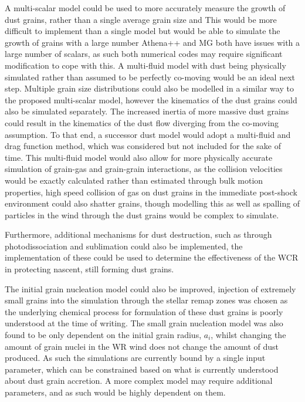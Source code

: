 A multi-scalar model could be used to more accurately measure the growth of dust grains, rather than a single average grain size and 
This would be more difficult to implement than a single model but would be able to simulate the growth of grains with a large number 
Athena++ and MG both have issues with a large number of scalars, as such both numerical codes may require significant modification to cope with this.
A multi-fluid model with dust being physically simulated rather than assumed to be perfectly co-moving would be an ideal next step.
Multiple grain size distributions could also be modelled in a similar way to the proposed multi-scalar model, however the kinematics of the dust grains could also be simulated separately.
The increased inertia of more massive dust grains could result in the kinematics of the dust flow diverging from the co-moving assumption.
To that end, a successor dust model would adopt a multi-fluid and drag function method, which was considered but not included for the sake of time.
This multi-fluid model would also allow for more physically accurate simulation of grain-gas and grain-grain interactions, as the collision velocities would be exactly calculated rather than estimated through bulk motion properties, high speed collision of gas on dust grains in the immediate post-shock environment could also shatter grains, though modelling this as well as spalling of particles in the wind through the dust grains would be complex to simulate. 

Furthermore, additional mechanisms for dust destruction, such as through photodissociation and sublimation could also be implemented, the implementation of these could be used to determine the effectiveness of the WCR in protecting nascent, still forming dust grains.


The initial grain nucleation model could also be improved, injection of extremely small grains into the simulation through the stellar remap zones was chosen as the underlying chemical process for formulation of these dust grains is poorly understood at the time of writing.
The small grain nucleation model was also found to be only dependent on the initial grain radius, $a_i$, whilst changing the amount of grain nuclei in the WR wind does not change the amount of dust produced.
As such the simulations are currently bound by a single input parameter, which can be constrained based on what is currently understood about dust grain accretion.
A more complex model may require additional parameters, and as such would be highly dependent on them.

